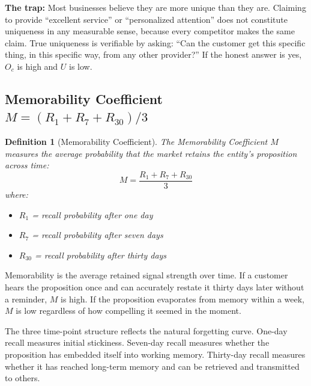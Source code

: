 \documentclass[12pt, openany]{book}
\theoremstyle{thmstyle}
\theoremstyle{defstyle}
\newtheorem{definition}{Definition}[chapter]
\begin{document}
\textbf{The trap:} Most businesses believe they are more unique than they are. Claiming to provide ``excellent service'' or ``personalized attention'' does not constitute uniqueness in any measurable sense, because every competitor makes the same claim. True uniqueness is verifiable by asking: ``Can the customer get this specific thing, in this specific way, from any other provider?'' If the honest answer is yes, $O_c$ is high and $U$ is low.

\subsection{Memorability Coefficient $M = (R_1 + R_7 + R_{30}) / 3$}

\begin{definition}[Memorability Coefficient]
The Memorability Coefficient $M$ measures the average probability that the market retains the entity's proposition across time:
\begin{equation}
M = \frac{R_1 + R_7 + R_{30}}{3}
\label{eq:memorability}
\end{equation}
where:
\begin{itemize}[leftmargin=1.5em]
  \item $R_1$ = recall probability after one day
  \item $R_7$ = recall probability after seven days
  \item $R_{30}$ = recall probability after thirty days
\end{itemize}
\end{definition}

Memorability is the average retained signal strength over time. If a customer hears the proposition once and can accurately restate it thirty days later without a reminder, $M$ is high. If the proposition evaporates from memory within a week, $M$ is low regardless of how compelling it seemed in the moment.

The three time-point structure reflects the natural forgetting curve. One-day recall measures initial stickiness. Seven-day recall measures whether the proposition has embedded itself into working memory. Thirty-day recall measures whether it has reached long-term memory and can be retrieved and transmitted to others.
\end{document}
